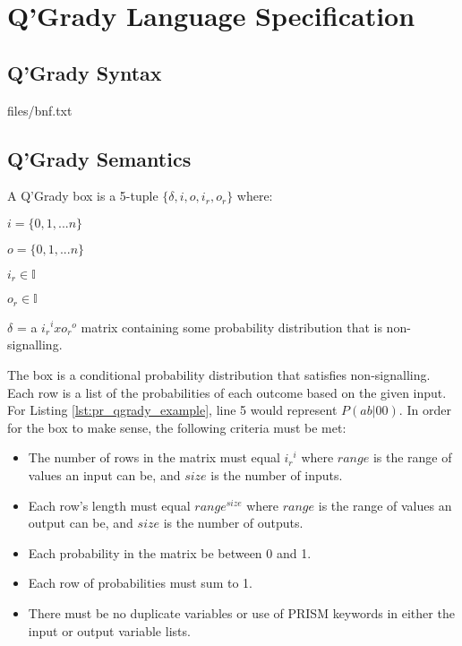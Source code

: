 \documentclass[report.tex]{subfiles}
\begin{document}
\chapter{Q'Grady Language Specification} %
\label{cha:q_grady_specification}
\section{Q'Grady Syntax} %
\label{sec:q_grady_syntax}

{files/bnf.txt} 

\section{Q'Grady Semantics} %
\label{sec:q_grady_semantics}
A Q'Grady box is a 5-tuple \(\{\delta, i, o, i_r, o_r\}\) where:

\(i = \{0, 1, ... n\}\)

\(o = \{0, 1, ... n\}\)

\(i_r \in \mathbb{I}\)

\(o_r \in \mathbb{I}\)

\(\delta\) = a \({i_r}^{i} x {o_r}^{o}\) matrix containing some probability 
distribution that is non-signalling.


The box is a conditional probability distribution that satisfies non-signalling.
Each row is a list of the probabilities of each outcome based on the given
input. For Listing \ref{lst:pr_qgrady_example}, line 5 would represent 
\(P(ab | 00)\). In order for the box to make sense, the following criteria must
be met:
\begin{itemize}
    \item The number of rows in the matrix must equal \({i_r}^{i}\) where
    \(range\) is the range of values an input can be, and \(size\) is the number
    of inputs.
    \item Each row's length must equal \(range ^{size}\) where \(range\) is
    the range of values an output can be, and \(size\) is the number of outputs.
    \item Each probability in the matrix be between 0 and 1.
    \item Each row of probabilities must sum to 1.
    \item There must be no duplicate variables or use of PRISM keywords in
    either the input or output variable lists.
\end{itemize}
\newpage
\end{document}
